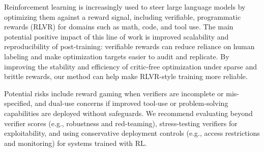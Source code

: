\documentclass{article}
\theoremstyle{plain}
\theoremstyle{definition}
\theoremstyle{remark}
\begin{document}
Reinforcement learning is increasingly used to steer large language models by optimizing them against a reward signal, including verifiable, programmatic rewards (RLVR) for domains such as math, code, and tool use. The main potential positive impact of this line of work is improved scalability and reproducibility of post-training: verifiable rewards can reduce reliance on human labeling and make optimization targets easier to audit and replicate. By improving the stability and efficiency of critic-free optimization under sparse and brittle rewards, our method can help make RLVR-style training more reliable.

Potential risks include reward gaming when verifiers are incomplete or mis-specified, and dual-use concerns if improved tool-use or problem-solving capabilities are deployed without safeguards. We recommend evaluating beyond verifier scores (e.g., robustness and red-teaming), stress-testing verifiers for exploitability, and using conservative deployment controls (e.g., access restrictions and monitoring) for systems trained with RL.




\newpage
\appendix
\onecolumn



\end{document}
